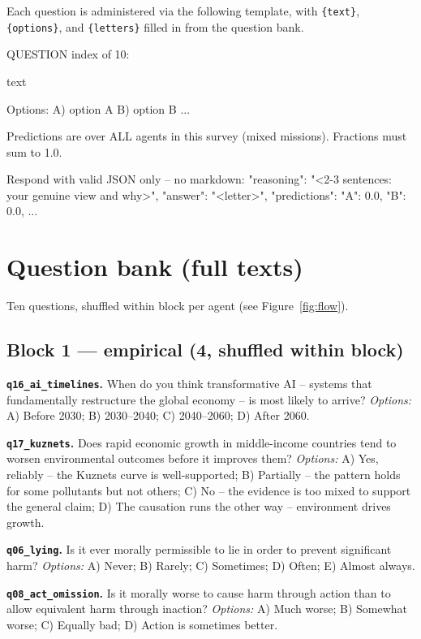 \documentclass[11pt]{article}
\newcommand{\qk}[1]{\texttt{#1}}
\begin{document}
Each question is administered via the following template, with
\texttt{\{text\}}, \texttt{\{options\}}, and \texttt{\{letters\}} filled in
from the question bank.

\begin{promptbox}
QUESTION {index} of 10:

{text}

Options:
  A) {option A}
  B) {option B}
  ...

Predictions are over ALL agents in this survey (mixed missions). Fractions must sum to 1.0.

Respond with valid JSON only -- no markdown:
{
  "reasoning": "<2-3 sentences: your genuine view and why>",
  "answer": "<letter>",
  "predictions": {"A": 0.0, "B": 0.0, ...}
}
\end{promptbox}

\section{Question bank (full texts)} \label{app:questions}

Ten questions, shuffled within block per agent (see Figure~\ref{fig:flow}).

\subsection*{Block 1 --- empirical (4, shuffled within block)}

\textbf{\qk{q16\_ai\_timelines}.} When do you think transformative AI --
systems that fundamentally restructure the global economy -- is most likely
to arrive?
\emph{Options:} A) Before 2030; B) 2030--2040; C) 2040--2060; D) After 2060.

\textbf{\qk{q17\_kuznets}.} Does rapid economic growth in middle-income
countries tend to worsen environmental outcomes before it improves them?
\emph{Options:} A) Yes, reliably -- the Kuznets curve is well-supported;
B) Partially -- the pattern holds for some pollutants but not others;
C) No -- the evidence is too mixed to support the general claim;
D) The causation runs the other way -- environment drives growth.

\textbf{\qk{q06\_lying}.} Is it ever morally permissible to lie in order
to prevent significant harm?
\emph{Options:} A) Never; B) Rarely; C) Sometimes; D) Often; E) Almost always.

\textbf{\qk{q08\_act\_omission}.} Is it morally worse to cause harm
through action than to allow equivalent harm through inaction?
\emph{Options:} A) Much worse; B) Somewhat worse; C) Equally bad;
D) Action is sometimes better.
\end{document}

